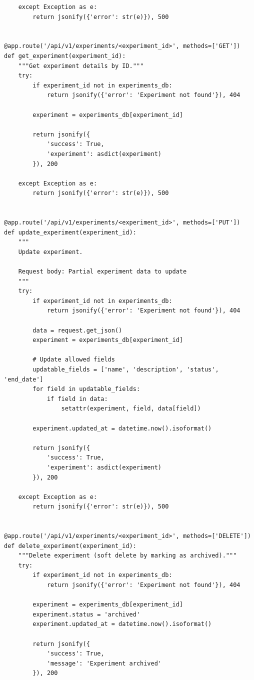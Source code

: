\begin{lstlisting}
    except Exception as e:
        return jsonify({'error': str(e)}), 500


@app.route('/api/v1/experiments/<experiment_id>', methods=['GET'])
def get_experiment(experiment_id):
    """Get experiment details by ID."""
    try:
        if experiment_id not in experiments_db:
            return jsonify({'error': 'Experiment not found'}), 404

        experiment = experiments_db[experiment_id]

        return jsonify({
            'success': True,
            'experiment': asdict(experiment)
        }), 200

    except Exception as e:
        return jsonify({'error': str(e)}), 500


@app.route('/api/v1/experiments/<experiment_id>', methods=['PUT'])
def update_experiment(experiment_id):
    """
    Update experiment.

    Request body: Partial experiment data to update
    """
    try:
        if experiment_id not in experiments_db:
            return jsonify({'error': 'Experiment not found'}), 404

        data = request.get_json()
        experiment = experiments_db[experiment_id]

        # Update allowed fields
        updatable_fields = ['name', 'description', 'status', 'end_date']
        for field in updatable_fields:
            if field in data:
                setattr(experiment, field, data[field])

        experiment.updated_at = datetime.now().isoformat()

        return jsonify({
            'success': True,
            'experiment': asdict(experiment)
        }), 200

    except Exception as e:
        return jsonify({'error': str(e)}), 500


@app.route('/api/v1/experiments/<experiment_id>', methods=['DELETE'])
def delete_experiment(experiment_id):
    """Delete experiment (soft delete by marking as archived)."""
    try:
        if experiment_id not in experiments_db:
            return jsonify({'error': 'Experiment not found'}), 404

        experiment = experiments_db[experiment_id]
        experiment.status = 'archived'
        experiment.updated_at = datetime.now().isoformat()

        return jsonify({
            'success': True,
            'message': 'Experiment archived'
        }), 200


\end{lstlisting}

